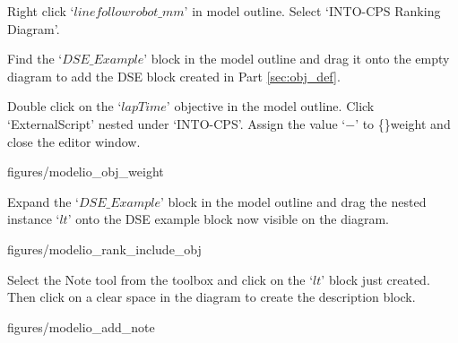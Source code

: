 \documentclass[11pt,a4paper]{../tutorial}
\begin{document}
\begin{instructions}

\item Right click `$linefollowrobot\_mm$' in model outline. Select `INTO-CPS \menusep Ranking Diagram'.

\item Find the `$DSE\_Example$' block in the model outline and drag it onto the empty diagram to add the DSE block created in Part \ref{sec:obj_def}.

\item \label{start_add_rank} Double click on the `$lapTime$' objective in the model outline. Click `ExternalScript' nested under `INTO-CPS'. Assign the value `$-$' to \{\}weight and close the editor window.

\begin{center}
\begin{annotation}[width=0.7\linewidth]{figures/modelio_obj_weight}
    \end{annotation}
\end{center}

\newpage

\item Expand the `$DSE\_Example$' block in the model outline and drag the nested instance `$lt$' onto the DSE example block now visible on the diagram.

\begin{center}
\begin{annotation}[width=0.7\linewidth]{figures/modelio_rank_include_obj}
    \end{annotation}
\end{center}

\newpage

\item Select the Note tool from the toolbox and click on the `$lt$' block just created. Then click on a clear space in the diagram to create the description block.

\begin{center}
\begin{annotation}[width=0.7\linewidth]{figures/modelio_add_note}
    \end{annotation}
\end{center}


\end{instructions}
\end{document}
